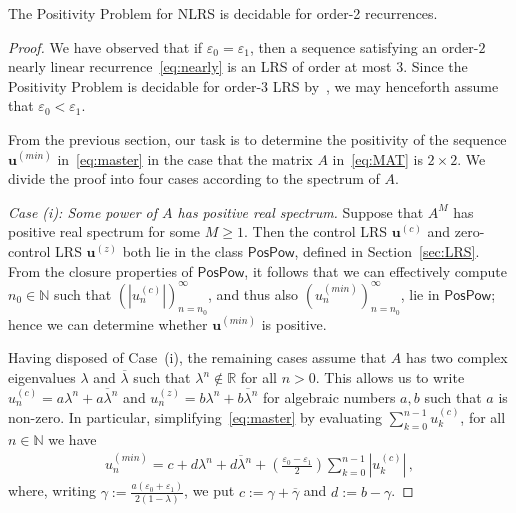\documentclass[a4paper,UKenglish,cleveref, autoref, thm-restate]{lipics-v2021}
\begin{document}
\begin{theorem}
    The Positivity Problem for NLRS is decidable for order-2 recurrences.
\end{theorem}
\begin{proof}
  We have observed that if $\varepsilon_0=\varepsilon_1$, then a
  sequence satisfying an order-$2$ nearly linear
  recurrence~\eqref{eq:nearly} is an LRS of order at most $3$.  Since the
  Positivity Problem is decidable for order-3 LRS by~\cite[Theorem
  5]{OuaknineW14}, we may henceforth assume that
  $\varepsilon_0<\varepsilon_1$.

  From the previous section,
  our task is to determine the positivity of the sequence
  $\boldsymbol u^{(min)}$ in~\eqref{eq:master} in the case that the
  matrix $A$ in~\eqref{eq:MAT} is $2 \times 2$.  
We divide the proof into four cases according to the spectrum of $A$.  

\emph{Case (i): Some power of $A$ has positive real spectrum.}
Suppose that $A^M$ has positive real spectrum for some $M\geq 1$.  
Then the control LRS $\boldsymbol u^{(c)}$ and zero-control LRS $\boldsymbol u^{(z)}$ both lie
in the class $\mathsf{PosPow}$, defined in Section~\ref{sec:LRS}.
From the closure properties of $\mathsf{PosPow}$, it follows that we can effectively compute $n_0\in \mathbb N$ such that $(|u_n^{(c)}|)_{n=n_0}^\infty$, and thus also
$(u^{(min)}_n)_{n=n_0}^\infty$, lie in $\mathsf{PosPow}$; hence we can determine whether $\boldsymbol u^{(min)}$ is positive.

Having disposed of Case~(i),
the remaining cases assume that $A$ has two complex eigenvalues $\lambda$ and $\overline{\lambda}$ such that $\lambda^n\not\in\mathbb R$ for all $n>0$.  
This allows us to write $u_n^{(c)}=a\lambda^n+\overline{a\lambda^n}$ and 
$u_n^{(z)}=b\lambda^n+\overline{b\lambda^n}$ for algebraic numbers $a,b$ such that $a$ is non-zero.  In particular, 
simplifying~\eqref{eq:master} by evaluating $\sum_{k=0}^{n-1}u_k^{(c)}$, for all $n\in \mathbb N$ we have
\begin{gather}
u_n^{(min)} = c+d\lambda^n+\overline{d\lambda^n} + \left(\frac{\varepsilon_0-\varepsilon_1}{2}\right) \sum_{k=0}^{n-1}|u^{(c)}_k| \, ,
    \label{eq:master-comp}
\end{gather}
where, writing
$\gamma:=\frac{a(\varepsilon_0+\varepsilon_1)}{2(1-\lambda)}$,  we put $c
:= \gamma+\overline{\gamma}$ and  $d:=b-\gamma$. 


\end{proof}
\end{document}
